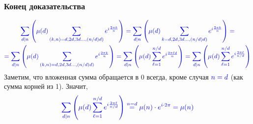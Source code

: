 \begin{frame}[t]
    \frametitle{Конец доказательства}
    \small
    \begin{gather*}
        \color{blue} \sum_{d \mid n} \left( \mu(d) \sum_{\left( k,n \right)=d,2d,3d \dots , \left( n / d) d \right)  } e^{i \frac{2\pi k}{n}} \right)= \sum_{d \mid n} \left( \mu(d) \sum_{k=d,2d,3d \dots , \left( n / d) d \right)  } e^{i \frac{2\pi k}{n}} \right) = \\ \color{blue}= \sum_{d \mid n} \left( \mu(d) \sum_{\left( k,n \right)=d,2d,3d \dots , \left( n / d) d \right)  } e^{i \frac{2\pi k}{n}} \right) 
        = \sum_{d \mid n} \left( \mu(d) \sum_{\ell = 1}^{n / d} e^{i \frac{2\pi \ell d}{n}} \right) = \sum_{d \mid n} \left( \mu(d) \sum_{\ell = 1}^{n / d} e^{i \frac{2\pi \ell}{n / d}} \right)
    \end{gather*}
    Заметим, что вложенная сумма обращается в 0 всегда, кроме случая $\color{blue} n = d$ (как сумма корней из 1). Значит,  \[
        \color{blue} \sum_{d \mid n} \left( \mu(d) \sum_{\ell = 1}^{n / d} e^{i \frac{2\pi \ell}{n / d}} \right) \overset{n = d} = \mu(n) \cdot e^{i \cdot 2\pi} = \mu(n) 
    \]
    \hfill \qedsymbol
\end{frame}
